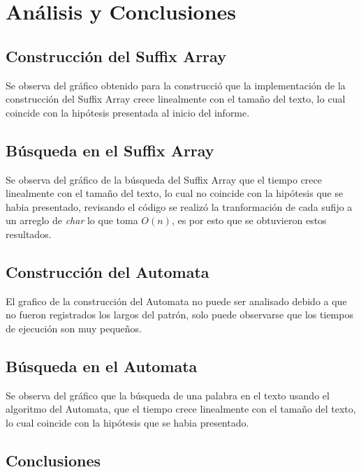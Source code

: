 \documentclass[letterpaper,10pt]{article}
\begin{document}
	\section{Análisis y Conclusiones}

	\subsection{Construcción del Suffix Array}
	
	Se observa del gráfico obtenido para la construcció que la implementación de la construcción del Suffix Array crece linealmente con el tamaño del texto, lo cual coincide con la hipótesis presentada al inicio del informe.


	\subsection{Búsqueda en el Suffix Array}
	
	Se observa del gráfico de la búsqueda del Suffix Array que el tiempo crece linealmente con el tamaño del texto, lo cual no coincide con la hipótesis que se habia presentado, revisando  el código se realizó la tranformación de cada sufijo a un arreglo de \textit{char} lo que toma $O(n)$, es por esto que se obtuvieron estos resultados.
    
    
    \subsection{Construcción del Automata}
	
	El grafico de la construcción del Automata no puede ser analisado debido a que no fueron registrados los largos del patrón, solo puede observarse que los tiempos de ejecución son muy pequeños.


	\subsection{Búsqueda en el Automata}
	
	Se observa del gráfico que la búsqueda de una palabra en el texto usando el algoritmo del Automata, que el tiempo crece linealmente con el tamaño del texto, lo cual coincide con la hipótesis que se habia presentado.



	\subsection{Conclusiones}
	
\end{document}
